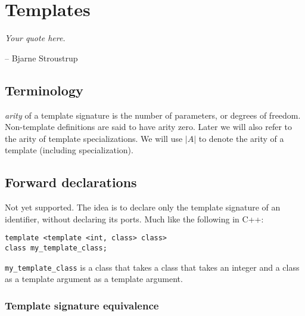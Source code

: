 

\chapter{Templates}
\label{sec:templates}

\begin{flushright}
{\itshape Your quote here.

\bigskip
-- Bjarne Stroustrup
}
\end{flushright}

\section{Terminology}
\label{sec:templates:terms}

\emph{arity} of a template signature is the number of parameters, 
or degrees of freedom.  
Non-template definitions are said to have arity zero.  
Later we will also refer to the arity of template specializations.  
We will use $|A|$ to denote the arity of a template (including specialization).  

\section{Forward declarations}
\label{sec:templates:forward}

Not yet supported.  
The idea is to declare only the template signature of an identifier, 
without declaring its ports.  
Much like the following in C++:

\begin{verbatim}
template <template <int, class> class>
class my_template_class;
\end{verbatim}

\noindent
\verb|my_template_class| is a class that takes a 
class that takes an integer and a class as a template argument 
as a template argument.  

\subsection{Template signature equivalence}
\label{sec:templates:forward:equiv}

